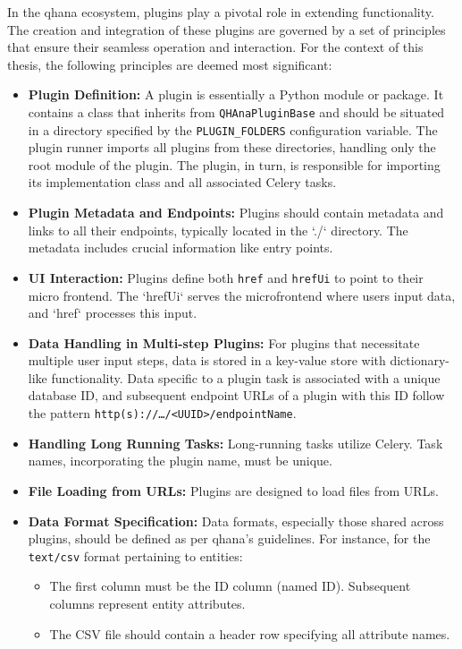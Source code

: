 \documentclass[
  a4paper,  %
  twoside,  %
  bibliography=totoc,
  headsepline,
  cleardoublepage=empty,
  parskip=half,
  draft=false
]{scrbook}
\begin{document}
In the \gls{qhana} ecosystem, plugins play a pivotal role in extending functionality.
The creation and integration of these plugins are governed by a set of principles that ensure their seamless operation and interaction.
For the context of this thesis, the following principles are deemed most significant:

\begin{itemize}
    \item \textbf{Plugin Definition:}
    A plugin is essentially a Python module or package.
    It contains a class that inherits from \texttt{QHAnaPluginBase} and should be situated in a directory specified by the \texttt{PLUGIN\_FOLDERS} configuration variable.
    The plugin runner imports all plugins from these directories, handling only the root module of the plugin.
    The plugin, in turn, is responsible for importing its implementation class and all associated Celery tasks.

    \item \textbf{Plugin Metadata and Endpoints:}
    Plugins should contain metadata and links to all their endpoints, typically located in the `./` directory.
    The metadata includes crucial information like entry points.

    \item \textbf{UI Interaction:}
    Plugins define both \texttt{href} and \texttt{hrefUi} to point to their micro frontend.
    The `hrefUi` serves the microfrontend where users input data, and `href` processes this input.

    \item \textbf{Data Handling in Multi-step Plugins:}
    For plugins that necessitate multiple user input steps, data is stored in a key-value store with dictionary-like functionality.
    Data specific to a plugin task is associated with a unique database ID, and subsequent endpoint URLs of a plugin with this ID follow the pattern \texttt{http(s)://…/<UUID>/endpointName}.

    \item \textbf{Handling Long Running Tasks:}
    Long-running tasks utilize Celery. Task names, incorporating the plugin name, must be unique.

    \item \textbf{File Loading from URLs:}
    Plugins are designed to load files from URLs.

    \item \textbf{Data Format Specification:}
    Data formats, especially those shared across plugins, should be defined as per \gls{qhana}'s guidelines.
    For instance, for the \texttt{text/csv} format pertaining to entities:
    \begin{itemize}
        \item The first column must be the ID column (named ID). Subsequent columns represent entity attributes.
        \item The CSV file should contain a header row specifying all attribute names.
    \end{itemize}
\end{itemize}
\end{document}
